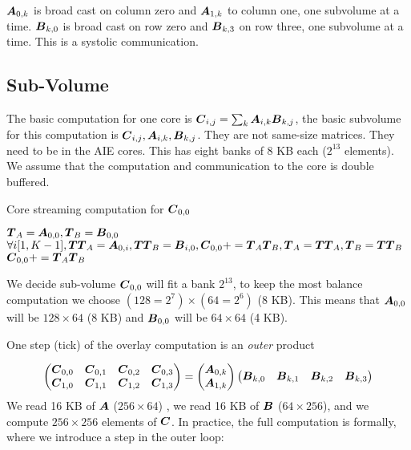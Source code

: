 \documentclass[conference]{IEEEtran}
\begin{document}
${\boldsymbol A}_{0,k}$ is broad cast on column zero and ${\boldsymbol A}_{1,k}$ to
column one, one subvolume at a time. ${\boldsymbol B}_{k,0}$ is broad cast on
row zero and ${\boldsymbol B}_{k,3}$ on row three, one subvolume at a
time. This is a systolic communication.

\subsection{Sub-Volume}
The basic computation for one core is ${\boldsymbol C}_{i,j} = \sum_k
{\boldsymbol A}_{i,k}{\boldsymbol B}_{k,j}$, the basic subvolume for this computation is
${\boldsymbol C}_{i,j}, {\boldsymbol A}_{i,k},{\boldsymbol B}_{k,j}$. They are not same-size matrices. They need to be in the AIE cores. This has eight banks of 8
KB each ($2^{13}$ elements).  We assume that the computation and
communication to the core is double buffered.
\begin{algorithm}
  \caption{Core streaming computation for ${\boldsymbol C}_{0,0}$}
  \label{alg:one}
  \begin{algorithmic}[1]
    \STATE ${\boldsymbol T}_A = {\boldsymbol A}_{0,0}, {\boldsymbol T}_B = {\boldsymbol B}_{0,0}$ 
    \STATE $\forall i [1,K-1], {\boldsymbol {TT}}_A = {\boldsymbol A}_{0,i} , {\boldsymbol {TT}}_B = {\boldsymbol B}_{i,0},    {\boldsymbol C}_{0,0} += {\boldsymbol T}_{A}{\boldsymbol T}_{B}, {\boldsymbol T}_A = {\boldsymbol {TT}}_{A} , {\boldsymbol T}_B = {\boldsymbol {TT}}_B$ 
    \STATE ${\boldsymbol C}_{0,0} += {\boldsymbol T}_{A}{\boldsymbol T}_{B}$ 
  \end{algorithmic}  
\end{algorithm}

We decide sub-volume ${\boldsymbol C}_{0,0}$ will fit a bank $2^{13}$, to keep
the most balance computation we choose $(128=2^7) \times (64=2^6)$ (8
KB). This means that ${\boldsymbol A}_{0,0}$ will be $128 \times 64$ (8 KB) and
${\boldsymbol B}_{0,0}$ will be $64 \times 64$ (4 KB).

One step (tick) of the overlay computation is an {\em outer} product

{\small \begin{equation}
  \label{eq:gemmA}
  \begin{pmatrix}
    \Vc{C}_{0,0}  &  \Vc{C}_{0,1}  & \Vc{C}_{0,2}  &\Vc{C}_{0,3} \\
    \Vc{C}_{1,0}  & \Vc{C}_{1,1}   & \Vc{C}_{1,2}  & \Vc{C}_{1,3} \\
  \end{pmatrix}    =
  \begin{pmatrix}
    \Vc{A}_{0,k}  \\
    \Vc{A}_{1,k}   \\
  \end{pmatrix}  
  \begin{pmatrix}
    \Vc{B}_{k,0}  &  \Vc{B}_{k,1}  & \Vc{B}_{k,2}  &\Vc{B}_{k,3} \\
  \end{pmatrix}    
\end{equation}
} We read 16 KB of ${\boldsymbol A}$ ($256 \times 64$) , we read 16 KB of
${\boldsymbol B}$ ($64 \times 256$), and we compute $256 \times 256$ elements
of ${\boldsymbol C}$. In practice, the full computation is formally, where we
introduce a step in the outer loop:
\end{document}
